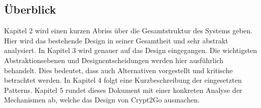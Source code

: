 \subsection{Überblick}
Kapitel 2 wird einen kurzen Abriss über die Gesamtstruktur des Systems geben. Hier wird das
bestehende Design in seiner Gesamtheit und sehr abstrakt analysiert. In Kapitel 3 wird genauer auf
das Design eingegangen. Die wichtigsten Abstraktionsebenen und Designentscheidungen werden hier
ausführlich behandelt. Dies bedeutet, dass auch Alternativen vorgestellt und kritische betrachtet
werden. In Kapitel 4 folgt eine Kurzbeschreibung der eingesetzten Patterns. Kapitel 5 rundet dieses
Dokument mit einer konkreten Analyse der Mechanismen ab, welche das Design von Crypt2Go
ausmachen.
